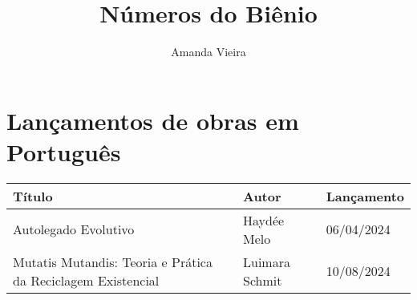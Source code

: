 \documentclass{gescons}
\author{Amanda Vieira}
\title{Números do Biênio}
\begin{document}
    \makeentrevistatitle


    

\section*{Lançamentos de obras em Português}

\begin{longtable}[]{@{}
  >{\raggedright\arraybackslash}p{}
  >{\raggedright\arraybackslash}p{}
  >{\raggedright\arraybackslash}p{}@{}}
\toprule\noalign{}
\begin{minipage}[b]{\linewidth}\centering
\textbf{Título}
\end{minipage} & \begin{minipage}[b]{\linewidth}\centering
\textbf{Autor}
\end{minipage} & \begin{minipage}[b]{\linewidth}\centering
\textbf{Lançamento}
\end{minipage} \\
\hline
\begin{minipage}[b]{\linewidth}\raggedright
Autolegado Evolutivo
\end{minipage} & \begin{minipage}[b]{\linewidth}\raggedright
Haydée Melo
\end{minipage} & \begin{minipage}[b]{\linewidth}\raggedright
06/04/2024
\end{minipage} \\
\hline
\begin{minipage}[b]{\linewidth}\raggedright
Mutatis Mutandis: Teoria e Prática da Reciclagem Existencial
\end{minipage} & \begin{minipage}[b]{\linewidth}\raggedright
Luimara Schmit
\end{minipage} & \begin{minipage}[b]{\linewidth}\raggedright
10/08/2024
\end{minipage} \\

\end{longtable}
\end{document}
